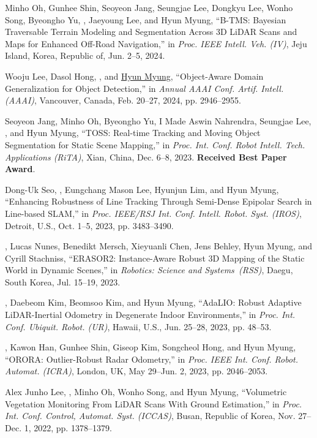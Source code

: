 \begin{pubSubsectionNum}
    \item Minho Oh, Gunhee Shin, Seoyeon Jang, Seungjae Lee, Dongkyu Lee, Wonho Song, Byeongho Yu, \hyungtaelim, Jaeyoung Lee, and Hyun Myung, ``B-TMS: Bayesian Traversable Terrain Modeling and Segmentation Across 3D LiDAR Scans and Maps for Enhanced Off-Road Navigation,'' in \textit{Proc. IEEE Intell. Veh. (IV)}, Jeju Island, Korea, Republic of, Jun. 2--5, 2024.
    \item Wooju Lee, Dasol Hong, \underline{\hyungtaelim}, and \underline{Hyun Myung}, ``Object-Aware Domain Generalization for Object Detection,'' in \textit{Annual AAAI Conf. Artif. Intell. (AAAI)}, Vancouver, Canada, Feb. 20--27, 2024, pp. 2946--2955.
    \item Seoyeon Jang, Minho Oh, Byeongho Yu, I Made Aswin Nahrendra, Seungjae Lee, \hyungtaelim, and Hyun Myung, ``TOSS: Real-time Tracking and Moving Object Segmentation for Static Scene Mapping,'' in \textit{Proc. Int. Conf. Robot Intell. Tech. Applications (RiTA)}, Xian, China, Dec. 6--8, 2023. \textbf{Received Best Paper Award}.
    \item Dong-Uk Seo, \hyungtaelim, Eungchang Mason Lee, Hyunjun Lim, and Hyun Myung, ``Enhancing Robustness of Line Tracking Through Semi-Dense Epipolar Search in Line-based SLAM,'' in \textit{Proc. IEEE/RSJ Int. Conf. Intell. Robot. Syst. (IROS)}, Detroit, U.S., Oct. 1--5, 2023, pp. 3483--3490.
    \item \hyungtaelim, Lucas Nunes, Benedikt Mersch, Xieyuanli Chen, Jens Behley, Hyun Myung, and Cyrill Stachniss, ``ERASOR2: Instance-Aware Robust 3D Mapping of the Static World in Dynamic Scenes,'' in \textit{Robotics: Science and Systems~(RSS)}, Daegu, South Korea, Jul. 15--19, 2023.
    \item \hyungtaelim, Daebeom Kim, Beomsoo Kim, and Hyun Myung, ``AdaLIO: Robust Adaptive LiDAR-Inertial Odometry in Degenerate Indoor Environments,'' in \textit{Proc. Int. Conf. Ubiquit. Robot. (UR)}, Hawaii, U.S., Jun. 25--28, 2023, pp. 48--53.
    \item \hyungtaelim, Kawon Han, Gunhee Shin, Giseop Kim, Songcheol Hong, and Hyun Myung, ``ORORA: Outlier-Robust Radar Odometry,'' in \textit{Proc. IEEE Int. Conf. Robot. Automat. (ICRA)}, London, UK, May 29--Jun. 2, 2023, pp. 2046--2053.
    \item Alex Junho Lee, \hyungtaelim, Minho Oh, Wonho Song, and Hyun Myung, ``Volumetric Vegetation Monitoring From LiDAR Scans With Ground Estimation,'' in \textit{Proc. Int. Conf. Control, Automat. Syst. (ICCAS)}, Busan, Republic of Korea, Nov. 27--Dec. 1, 2022, pp. 1378--1379.

\end{pubSubsectionNum}
